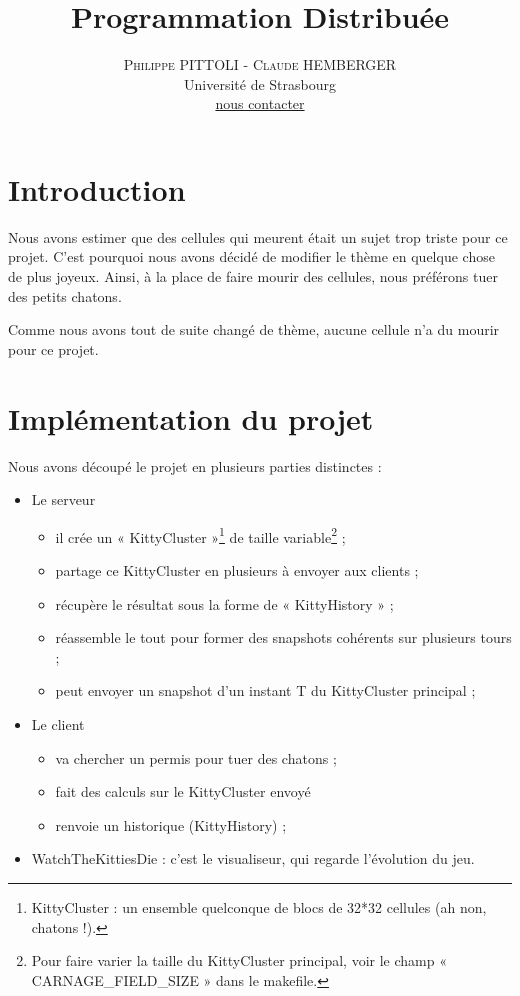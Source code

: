 \documentclass[twoside]{article}
\title{\vspace{-15mm}\fontsize{24pt}{10pt}\selectfont\textbf{Programmation Distribuée}}
\author{
\large
\textsc{Philippe PITTOLI - Claude HEMBERGER}\\[2mm]
\normalsize Université de Strasbourg \\ 
\normalsize \href{mailto:philippe.pittoli@etu.unistra.fr}{nous contacter}
\vspace{-5mm}
}
\date{}
\begin{document}
\maketitle %

\thispagestyle{fancy} %



\section{Introduction}
Nous avons estimer que des cellules qui meurent était un sujet trop triste pour ce projet.
C'est pourquoi nous avons décidé de modifier le thème en quelque chose de plus joyeux.
Ainsi, à la place de faire mourir des cellules, nous préférons tuer des petits chatons.

Comme nous avons tout de suite changé de thème, aucune cellule n'a du mourir pour ce projet.

\section{Implémentation du projet}
Nous avons découpé le projet en plusieurs parties distinctes : 
\begin{itemize}
	\item Le serveur 
		\begin{itemize}
			\item il crée un « KittyCluster »\protect\footnote{
					KittyCluster : un ensemble quelconque de blocs de 32*32 cellules (ah non, chatons !).
				} de taille variable\protect\footnote{
					Pour faire varier la taille du KittyCluster principal, 
						 voir le champ « CARNAGE\_FIELD\_SIZE » dans le makefile.
				} ;
			\item partage ce KittyCluster en plusieurs à envoyer aux clients ;
			\item récupère le résultat sous la forme de « KittyHistory » ;
			\item réassemble le tout pour former des snapshots cohérents sur plusieurs tours ;
			\item peut envoyer un snapshot d'un instant T du KittyCluster principal ;
		\end{itemize}
	\item Le client
		\begin{itemize}
			\item va chercher un permis pour tuer des chatons ;
			\item fait des calculs sur le KittyCluster envoyé  
			\item renvoie un historique (KittyHistory) ;
		\end{itemize}
	\item WatchTheKittiesDie : c'est le visualiseur, qui regarde l'évolution du jeu.
\end{itemize}
\end{document}
